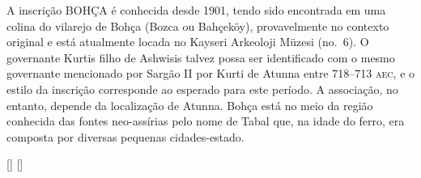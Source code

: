 \documentclass{luvita}
\begin{document}
A inscrição BOHÇA é conhecida desde 1901, tendo sido encontrada
em uma colina do vilarejo de Bohça (Bozca ou Bahçeköy),
provavelmente no contexto original e está atualmente locada no Kayseri
Arkeoloji Müzesi (no.\ 6).
O governante Kurtis filho de Ashwisis talvez possa ser identificado com o
mesmo governante mencionado por Sargão II por Kurti de Atunna entre 718--713
\textsc{aec}, e o estilo da inscrição corresponde ao esperado para este
período.
A associação, no entanto, depende da localização de Atunna.
Bohça está no meio da região conhecida das fontes
neo-assírias pelo nome de Tabal que, na idade do ferro, era composta por
diversas pequenas cidades-estado.


\clearpage
\begin{parnumbersa}[]
	\raggedright%

	\Large {}\hspace{5pt}
	[\luwmasc]\hspace{5pt}
	\luwmasc{}\hspace{5pt}
	\luwmasc{}\hspace{5pt}
	\luwmasc{}\hspace{5pt}
	\hspace{5pt}
	\luwmasc{}\hspace{5pt}
	\luwmasc{}\hspace{5pt}
	\luwmasc{}\hspace{5pt}
	[\luwmasc]\hspace{5pt}

	\Large \luwmasc{}\hspace{5pt}
	\luwmasc{}\hspace{5pt}
	\luwmasc{}\hspace{5pt}
	\luwmasc{}


	\Large \luwmasc{}\hspace{5pt}
	\luwmasc{}\hspace{5pt}
	\luwmasc{}\hspace{5pt}
	\luwmasc{}\hspace{5pt}
	\luwmasc{}\hspace{5pt}



\end{parnumbersa}
\end{document}
